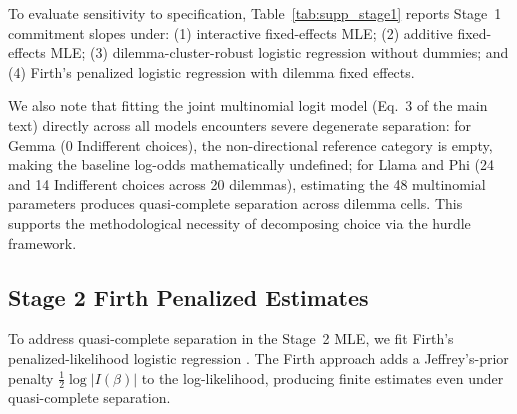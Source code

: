 \documentclass[10pt,journal,compsoc]{IEEEtran}
\begin{document}
To evaluate sensitivity to specification, Table~\ref{tab:supp_stage1} reports Stage~1 commitment slopes under: (1) interactive fixed-effects MLE; (2) additive fixed-effects MLE; (3) dilemma-cluster-robust logistic regression without dummies; and (4) Firth's penalized logistic regression with dilemma fixed effects.

We also note that fitting the joint multinomial logit model (Eq.~3 of the main text) directly across all models encounters severe degenerate separation: for Gemma (0 Indifferent choices), the non-directional reference category is empty, making the baseline log-odds mathematically undefined; for Llama and Phi (24 and 14 Indifferent choices across 20 dilemmas), estimating the 48 multinomial parameters produces quasi-complete separation across dilemma cells. This supports the methodological necessity of decomposing choice via the hurdle framework.

\begin{table}[!h]
\centering
\caption{Stage 1 Commitment Model Sensitivity Across Specifications}
\label{tab:supp_stage1}
\small
{}
\end{table}

\subsection{Stage 2 Firth Penalized Estimates}
To address quasi-complete separation in the Stage~2 MLE, we fit Firth's penalized-likelihood logistic regression \cite{firth_1993}. The Firth approach adds a Jeffrey's-prior penalty $\frac{1}{2}\log|I(\beta)|$ to the log-likelihood, producing finite estimates even under quasi-complete separation.
\end{document}

